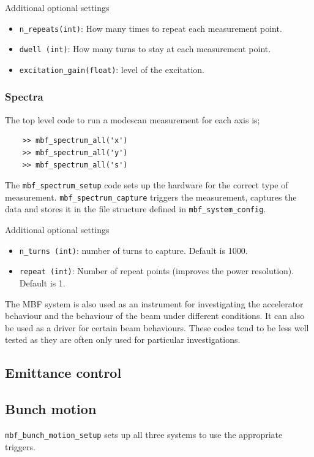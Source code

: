 \documentclass{report}
\begin{document}
Additional optional settings
\begin{itemize}
    \item \verb|n_repeats(int)|: How many times to repeat each measurement point.
    \item \verb|dwell (int)|: How many turns to stay at each measurement point.
    \item \verb|excitation_gain(float)|: level of the excitation.
\end{itemize}

\subsubsection{Spectra}
The top level code to run a modescan measurement for each axis is; 
\begin{verbatim}
    >> mbf_spectrum_all('x') 
    >> mbf_spectrum_all('y') 
    >> mbf_spectrum_all('s') 
\end{verbatim}

The \verb|mbf_spectrum_setup| code sets up the hardware for the correct type of measurement. \verb|mbf_spectrum_capture| triggers the measurement, captures the data and stores it in the file structure defined in \verb|mbf_system_config|. 

Additional optional settings
\begin{itemize}
    \item \verb|n_turns (int)|: number of turns to capture. Default is 1000.
    \item \verb|repeat (int)|: Number of repeat points (improves the power resolution). Default is 1.
\end{itemize}

The MBF system is also used as an instrument for investigating the accelerator behaviour and the behaviour of the beam under different conditions. It can also be used as a driver for certain beam behaviours. These codes tend to be less well tested as they are often only used for particular investigations.
\subsection{Emittance control}
\subsection{Bunch motion}

 \verb|mbf_bunch_motion_setup| sets up all three systems to use the appropriate triggers. 
 
\end{document}
